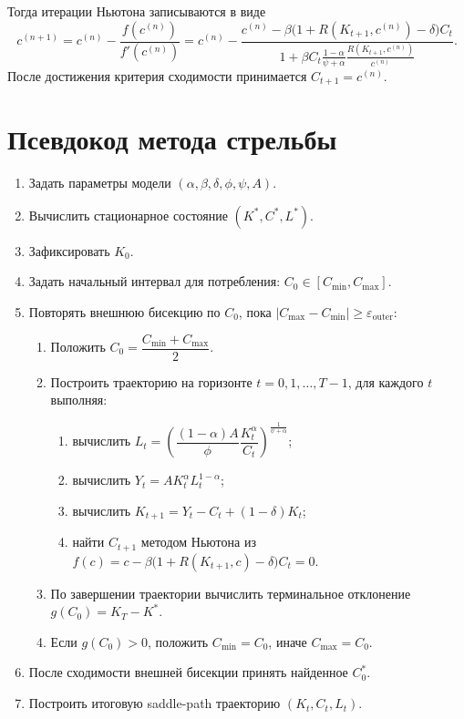     Тогда итерации Ньютона записываются в виде
    \[
    c^{(n+1)}=
    c^{(n)}-\frac{f(c^{(n)})}{f'(c^{(n)})}
    =
    c^{(n)}-
    \frac{c^{(n)}-\beta\bigl(1+R(K_{t+1},c^{(n)})-\delta\bigr)C_t}
    {1+\beta C_t \frac{1-\alpha}{\psi+\alpha}\frac{R(K_{t+1},c^{(n)})}{c^{(n)}}}.
    \]
    После достижения критерия сходимости принимается \(C_{t+1}=c^{(n)}\).

\section{Псевдокод метода стрельбы}
    \begin{enumerate}[label=\arabic*)]
        \item Задать параметры модели $(\alpha,\beta,\delta,\phi,\psi,A)$.
        \item Вычислить стационарное состояние $(K^*,C^*,L^*)$.
        \item Зафиксировать $K_0$.
        \item Задать начальный интервал для потребления: $C_0\in[C_{\min},C_{\max}]$.
        \item Повторять внешнюю бисекцию по $C_0$, пока $|C_{\max}-C_{\min}|\ge\varepsilon_{\text{outer}}$:
        \begin{enumerate}[label=\alph*),leftmargin=2em]
            \item Положить $C_0=\dfrac{C_{\min}+C_{\max}}{2}$.
            \item Построить траекторию на горизонте $t=0,1,\dots,T-1$, для каждого $t$ выполняя:
            \begin{enumerate}[label=\roman*.,leftmargin=2em]
                \item вычислить $L_t=\left(\dfrac{(1-\alpha)A}{\phi}\dfrac{K_t^\alpha}{C_t}\right)^{\frac{1}{\psi+\alpha}}$;
                \item вычислить $Y_t=A K_t^\alpha L_t^{1-\alpha}$;
                \item вычислить $K_{t+1}=Y_t-C_t+(1-\delta)K_t$;
                \item найти $C_{t+1}$ методом Ньютона из $f(c)=c-\beta\bigl(1+R(K_{t+1},c)-\delta\bigr)C_t=0$.
            \end{enumerate}
            \item По завершении траектории вычислить терминальное отклонение $g(C_0)=K_T-K^*$.
            \item Если $g(C_0)>0$, положить $C_{\min}=C_0$, иначе $C_{\max}=C_0$.
        \end{enumerate}
        \item После сходимости внешней бисекции принять найденное $C_0^*$.
        \item Построить итоговую saddle-path траекторию $(K_t,C_t,L_t)$.
    \end{enumerate}
